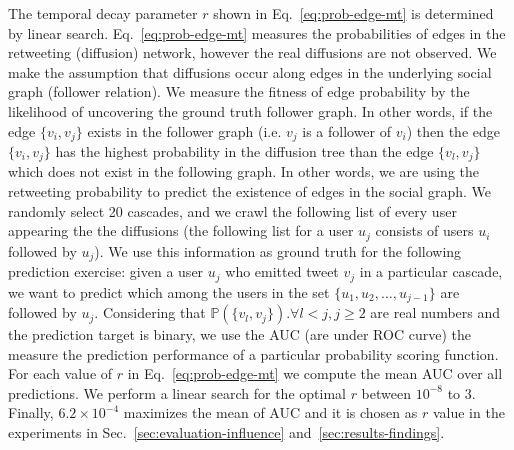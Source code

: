 The temporal decay parameter $r$ shown in Eq.~\eqref{eq:prob-edge-mt} is determined by linear search. 
Eq.~\eqref{eq:prob-edge-mt} measures the probabilities of edges in the retweeting (diffusion) network, however the real diffusions are not observed.
We make the assumption that diffusions occur along edges in the underlying social graph (follower relation).
We measure the fitness of edge probability by the likelihood of uncovering the ground truth follower graph.
In other words, if the edge $\{v_i, v_j\}$ exists in the follower graph (i.e. $v_j$ is a follower of $v_i$) then the edge $\{v_i, v_j\}$  has the highest probability in the diffusion tree than the edge $\{v_l, v_j\}$ which does not exist in the following graph.
In other words, we are using the retweeting probability to predict the existence of edges in the social graph.
We randomly select 20 cascades, and we crawl the following list of every user appearing the the diffusions (the following list for a user $u_j$ consists of users $u_i$ followed by $u_j$).
We use this information as ground truth for the following prediction exercise:
given a user $u_j$ who emitted tweet $v_j$ in a particular cascade, we want to predict which among the users in the set $\{u_1, u_2, \ldots, u_{j-1}\}$ are followed by $u_j$.
Considering that $\mathds{P}(\{v_l, v_j\}). \forall l < j, j \geq 2$ are real numbers and the prediction target is binary, we use the AUC (are under ROC curve) the measure the prediction performance of a particular probability scoring function.
For each value of $r$ in Eq.~\eqref{eq:prob-edge-mt} we compute the mean AUC over all predictions.
We perform a linear search for the optimal $r$ between $10^{-8}$ to $3$. 
Finally, $6.2\times10^{-4}$ maximizes the mean of AUC and it is chosen as $r$ value in the experiments in Sec.~\ref{sec:evaluation-influence} and~\ref{sec:results-findings}.
%
%
%

